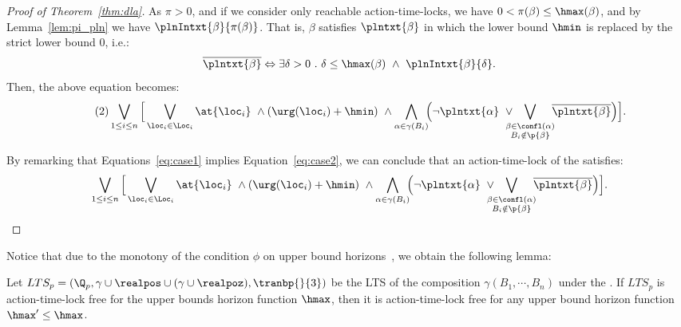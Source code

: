 \begin{proof}[Proof of Theorem~\ref{thm:dla}]
As $\pi > 0$, and if we consider only reachable action-time-locks, we have $0 < \pi(\beta) \leq \hmax(\beta)$, and by Lemma~\ref{lem:pi_pln} we have $\plnIntxt{\beta}{\pi(\beta)}$.
That is, $\beta$ satisfies  $\plntxt{\beta}$ in which the lower bound $\hmin$ is replaced by the strict lower bound 0, i.e.:
\begin{displaymath}
\overline{\plntxt{\beta}} \Leftrightarrow \exists \delta > 0\ . \ \delta \leq \hmax(\beta) \ \wedge \ \plnIntxt{\beta}{\delta}.
\end{displaymath}
Then, the above equation becomes:
\begin{equation}
  \label{eq:case2}\tag{2}
  \bigvee_{1\le i\le n}\Big[\bigvee_{\loc_i \in \Loc_i}\at{\loc_i}\ \wedge(\urg(\loc_i)+\hmin) \ \wedge\bigwedge_{\alpha \in \gamma(B_i)}\hspace*{-1ex}\Big(  \neg\plntxt{\alpha} \
  \vee\hspace*{-2ex}\bigvee_{\substack{\beta\in\confl(\alpha)\\B_i\notin\p{\beta}}}\hspace*{-1ex}\overline{\plntxt{\beta}} \Big)\Big].
\end{equation}

By remarking that Equations~\ref{eq:case1} implies Equation~\ref{eq:case2}, we can conclude that an
action-time-lock of the \lps satisfies:
\begin{displaymath}
  \bigvee_{1\le i\le n}\Big[\bigvee_{\loc_i \in \Loc_i}\at{\loc_i}\ \wedge(\urg(\loc_i)+\hmin) \ \wedge\bigwedge_{\alpha \in \gamma(B_i)}\hspace*{-1ex}\Big(  \neg\plntxt{\alpha} \
  \vee\hspace*{-2ex}\bigvee_{\substack{\beta\in\confl(\alpha)\\B_i\notin\p{\beta}}}\hspace*{-1ex}\overline{\plntxt{\beta}} \Big)\Big].
\end{displaymath}
\end{proof}

Notice that due to the monotony of the condition $\phi$ on upper bound horizons~\cite{FM:plan}, we obtain the following lemma: 
\begin{lemma}
  Let $LTS_p=(\Q_p,\gamma\cup\realpos\cup(\gamma\cup\realpoz),\tranbp{}{3})$ be the LTS of the composition $\gamma(B_1,\cdots,B_n)$ under the 
  \lpsabrb. If $LTS_p$ is action-time-lock free for the upper bounds horizon function $\hmax$, then it is action-time-lock free
  for any upper bound horizon function $\hmax'\le\hmax$.
\end{lemma}

